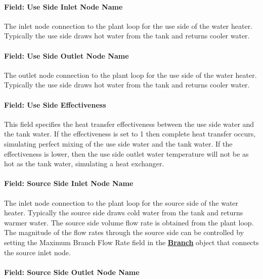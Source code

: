 \paragraph{Field: Use Side Inlet Node Name}\label{field-use-side-inlet-node-name-000}

The inlet node connection to the plant loop for the use side of the water heater. Typically the use side draws hot water from the tank and returns cooler water.

\paragraph{Field: Use Side Outlet Node Name}\label{field-use-side-outlet-node-name-000}

The outlet node connection to the plant loop for the use side of the water heater. Typically the use side draws hot water from the tank and returns cooler water.

\paragraph{Field: Use Side Effectiveness}\label{field-use-side-effectiveness}

This field specifies the heat transfer effectiveness between the use side water and the tank water. If the effectiveness is set to 1 then complete heat transfer occurs, simulating perfect mixing of the use side water and the tank water. If the effectiveness is lower, then the use side outlet water temperature will not be as hot as the tank water, simulating a heat exchanger.

\paragraph{Field: Source Side Inlet Node Name}\label{field-source-side-inlet-node-name-000}

The inlet node connection to the plant loop for the source side of the water heater. Typically the source side draws cold water from the tank and returns warmer water.
The source side volume flow rate is obtained from the plant loop.
The magnitude of the flow rates through the source side can be controlled by setting the Maximum Branch Flow Rate field in the \textbf{\hyperref[branch]{Branch}} object that connects the source inlet node.

\paragraph{Field: Source Side Outlet Node Name}\label{field-source-side-outlet-node-name-000}

